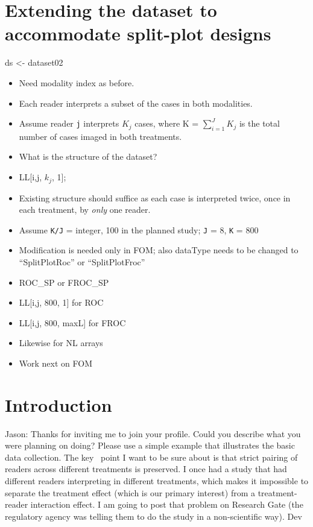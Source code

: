 \documentclass[]{book}
\newenvironment{Shaded}{\begin{snugshade}}{\end{snugshade}}
\newcommand{\NormalTok}[1]{#1}
\newcommand{\StringTok}[1]{\textcolor[rgb]{0.31,0.60,0.02}{#1}}
\providecommand{\tightlist}{%
  \setlength{\itemsep}{0pt}\setlength{\parskip}{0pt}}
\begin{document}
\hypertarget{extending-the-dataset-to-accommodate-split-plot-designs}{%
\section{Extending the dataset to accommodate split-plot designs}\label{extending-the-dataset-to-accommodate-split-plot-designs}}

\begin{Shaded}
\begin{Highlighting}[]
\NormalTok{ds <-}\StringTok{ }\NormalTok{dataset02}
\end{Highlighting}
\end{Shaded}

\begin{itemize}
\tightlist
\item
  Need modality index as before.
\item
  Each reader interprets a subset of the cases in both modalities.
\item
  Assume reader \texttt{j} interprets \(K_j\) cases, where K = \(\sum_{i=1}^{J} K_j\) is the total number of cases imaged in both treatments.
\item
  What is the structure of the dataset?
\item
  LL{[}i,j, \(k_j\), 1{]};
\item
  Existing structure should suffice as each case is interpreted twice, once in each treatment, by \emph{only} one reader.
\item
  Assume \texttt{K/J} = integer, 100 in the planned study; \texttt{J} = 8, \texttt{K} = 800
\item
  Modification is needed only in FOM; also dataType needs to be changed to ``SplitPlotRoc'' or ``SplitPlotFroc''
\item
  ROC\_SP or FROC\_SP
\item
  LL{[}i,j, 800, 1{]} for ROC
\item
  LL{[}i,j, 800, maxL{]} for FROC
\item
  Likewise for NL arrays
\item
  Work next on FOM
\end{itemize}

\hypertarget{introduction-2}{%
\section{Introduction}\label{introduction-2}}

Jason:
Thanks for inviting me to join your profile. Could you describe what you were planning on doing? Please use a simple example that illustrates the basic data collection. The key ~point I want to be sure about is that strict pairing of readers across different treatments is preserved. I once had a study that had different readers interpreting in different treatments, which makes it impossible to separate the treatment effect (which is our primary interest) from a treatment-reader interaction effect. I am going to post that problem on Research Gate (the regulatory agency was telling them to do the study in a non-scientific way). Dev
\end{document}
